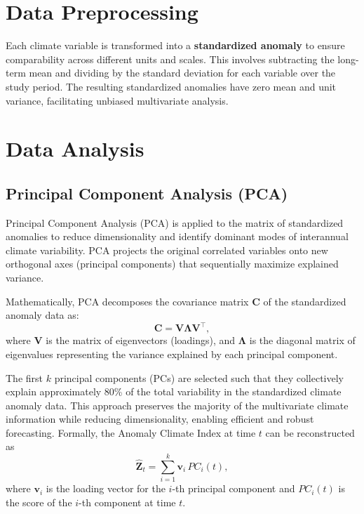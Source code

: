 \documentclass[12pt,a4paper]{report}
\begin{document}
\section{Data Preprocessing}
Each climate variable is transformed into a \textbf{standardized anomaly} to ensure comparability across different units and scales. 
This involves subtracting the long-term mean and dividing by the standard deviation for each variable over the study period. 
The resulting standardized anomalies have zero mean and unit variance, facilitating unbiased multivariate analysis.

\section{Data Analysis}

\subsection{Principal Component Analysis (PCA)}
Principal Component Analysis (PCA) is applied to the matrix of standardized anomalies to reduce dimensionality and identify dominant modes of interannual climate variability. 
PCA projects the original correlated variables onto new orthogonal axes (principal components) that sequentially maximize explained variance.

Mathematically, PCA decomposes the covariance matrix \( \mathbf{C} \) of the standardized anomaly data as:
\[
\mathbf{C} = \mathbf{V} \mathbf{\Lambda} \mathbf{V}^\top,
\]
where \( \mathbf{V} \) is the matrix of eigenvectors (loadings), and \( \mathbf{\Lambda} \) is the diagonal matrix of eigenvalues representing the variance explained by each principal component.

The first \(k\) principal components (PCs) are selected such that they collectively explain approximately 80\% of the total variability in the standardized climate anomaly data. 
This approach preserves the majority of the multivariate climate information while reducing dimensionality, enabling efficient and robust forecasting. 
Formally, the Anomaly Climate Index at time \(t\) can be reconstructed as
\[
\hat{\mathbf{Z}}_t = \sum_{i=1}^k \mathbf{v}_i \, PC_i(t),
\]
where \(\mathbf{v}_i\) is the loading vector for the \(i\)-th principal component and \(PC_i(t)\) is the score of the \(i\)-th component at time \(t\).
\end{document}
